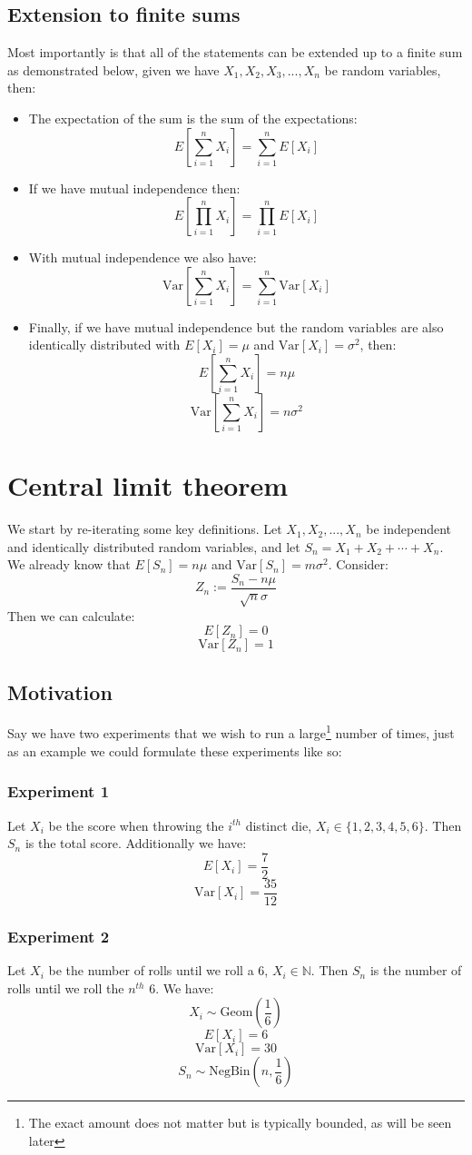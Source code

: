 \documentclass[12pt]{article}
\newcommand{\Var}[1]{\text{Var}[#1]}
\begin{document}
\subsection*{Extension to finite sums}
Most importantly is that all of the statements can be extended up to a finite sum as demonstrated below, given we have \(X_1,X_2,X_3,...,X_n\) be random variables, then:
\begin{itemize}
    \item The expectation of the sum is the sum of the expectations:
    \[E\left[\sum^n_{i=1}X_i\right]=\sum^n_{i=1}E[X_i]\]
    \item If we have mutual independence then:
    \[E\left[\prod^n_{i=1}X_i\right]=\prod^n_{i=1}E[X_i]\]
    \item With mutual independence we also have:
    \[\text{Var}\left[\sum^n_{i=1}X_i\right]=\sum^n_{i=1}\Var{X_i}\]
    \item Finally, if we have mutual independence but the random variables are also identically distributed with \(E[X_i]=\mu\) and \(\Var{X_i}=\sigma^2\), then:
    \[E\left[\sum^n_{i=1}X_i\right]=n\mu\]
    \[\text{Var}\left[\sum^n_{i=1}X_i\right]=n\sigma^2\]
\end{itemize}
\section{Central limit theorem}
We start by re-iterating some key definitions. Let \(X_1,X_2,...,X_n\) be independent and identically distributed random variables, and let \(S_n=X_1+X_2+\cdots+X_n\). We already know that \(E[S_n]=n\mu\) and \(\Var{S_n}=m\sigma^2\). Consider:
\[Z_n:=\frac{S_n-n\mu}{\sqrt{n}\sigma}\]
Then we can calculate:
\[E[Z_n]=0\]
\[\Var{Z_n}=1\]
\subsection*{Motivation}
Say we have two experiments that we wish to run a large\footnote{The exact amount does not matter but is typically bounded, as will be seen later} number of times, just as an example we could formulate these experiments like so:
\subsubsection*{Experiment 1}
Let \(X_i\) be the score when throwing the \(i^{th}\) distinct die, \(X_i\in\{1,2,3,4,5,6\}\). Then \(S_n\) is the total score. Additionally we have:
\[E[X_i]=\frac{7}{2}\]
\[\Var{X_i}=\frac{35}{12}\]
\subsubsection*{Experiment 2}
Let \(X_i\) be the number of rolls until we roll a 6, \(X_i\in\mathbb{N}\). Then \(S_n\) is the number of rolls until we roll the \(n^{th}\) 6. We have:
\[X_i\sim\text{Geom}(\frac{1}{6})\]
\[E[X_i]=6\]
\[\Var{X_i}=30\]
\[S_n\sim\text{NegBin}(n,\frac{1}{6})\]
\end{document}
